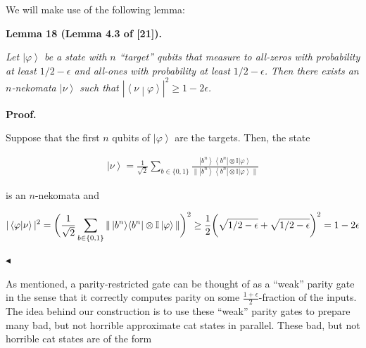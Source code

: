 \documentclass[10pt,a4paper]{article}
\begin{document}
We will make use of the following lemma:\par





\par\medskip\noindent\textbf{
\textbf{Lemma 18}\textbf{ }(Lemma 4.3 of [21])\textbf{.}
}\par



\emph{Let $\left|\varphi\right\rangle$ be a state with $n$ “target” qubits that measure to all-zeros with probability at least $1/2-\epsilon$ and all-ones with probability at least $1/2-\epsilon$. Then there exists an $n$-nekomata $\left|\nu\right\rangle$ such that $|\left\langle\nu\middle|\varphi\right\rangle|^{2}\geq 1-2\epsilon$.}\par






\par\medskip\noindent\textbf{Proof.}\par




Suppose that the first $n$ qubits of $\left|\varphi\right\rangle$ are the targets. Then, the state\par


\[\begin{gathered}
\left|\nu\right\rangle=\frac{1}{\sqrt{2}}\sum_{b\in\{0,1\}}\frac{\left|b^{n}\right\rangle\!\left\langle b^{n}\right|\otimes\mathbb{I}\left|\varphi\right\rangle}{\|\left|b^{n}\right\rangle\!\left\langle b^{n}\right|\otimes\mathbb{I}\left|\varphi\right\rangle\|}
\end{gathered}\]


is an $n$-nekomata and\par


\[\begin{gathered}
\displaystyle|\left\langle\varphi\middle|\nu\right\rangle|^{2}=\bigg{(}\frac{1}{\sqrt{2}}\sum_{b\in\{0,1\}}\|\left|b^{n}\right\rangle\!\left\langle b^{n}\right|\otimes\mathbb{I}\left|\varphi\right\rangle\|\bigg{)}^{2}\geq\frac{1}{2}\bigg{(}\sqrt{1/2-\epsilon}+\sqrt{1/2-\epsilon}\bigg{)}^{2}=1-2\epsilon
\end{gathered}\]


$\blacktriangleleft$\par




As mentioned, a parity-restricted gate can be thought of as a “weak” parity gate in the sense that it correctly computes parity on some $\frac{1+\epsilon}{2}$-fraction of the inputs. The idea behind our construction is to use these “weak” parity gates to prepare many bad, but not horrible approximate cat states in parallel. These bad, but not horrible cat states are of the form\par
\end{document}
